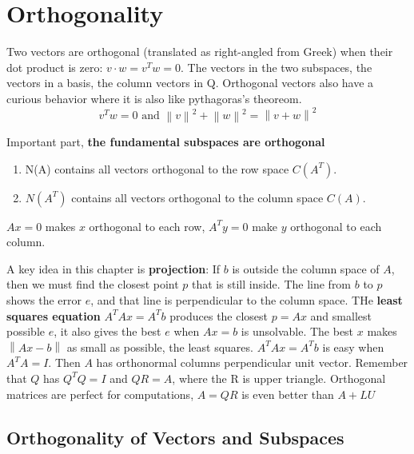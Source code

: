 \chapter{Orthogonality}

Two vectors are orthogonal (translated as right-angled from Greek) when their dot product is zero: \(v \cdot w = v^{T}w = 0\). The vectors in the two subspaces, the vectors in a basis, the column vectors in Q. Orthogonal vectors also have a curious behavior where it is also like pythagoras's theoreom. 
\[
    v^{T}w = 0 \text{ and } \left\lVert v \right\rVert^2 + \left\lVert w \right\rVert^2 = \left\lVert v + w \right\lVert^2
\] 

Important part, \textbf{the fundamental subspaces are orthogonal}
\begin{enumerate}
    \item N(A) contains all vectors orthogonal to the row space \(C(A^T)\).
    \item \(N(A^T)\)  contains all vectors orthogonal to the column space \(C(A)\). 
\end{enumerate} 
\(Ax = 0\) makes \(x\) orthogonal to each row, \(A^{T}y = 0\) make \(y\) orthogonal to each column. 

A key idea in this chapter is \textbf{projection}: If \(b\) is outside the column space of \(A\), then we must find the closest point \(p\) that is still inside. The line from \(b\) to \(p\) shows the error \(e\), and that line is perpendicular to the column space.    THe \textbf{least squares equation} \(A^{T}Ax = A^{T}b\) produces the closest \(p = Ax\) and smallest possible \(e\), it also gives the best \(e\) when \(Ax = b\) is unsolvable. The best \(x\) makes \(\left\lVert Ax - b \right\lVert\) as small as possible, the least squares. \(A^{T}Ax = A^{T}b\) is easy when \(A^{T}A = I\). Then \(A\) has orthonormal columns perpendicular unit vector. Remember that \(Q\) has \(Q^{T}Q = I\) and \(QR = A\), where the R is upper triangle. Orthogonal matrices are perfect for computations, \(A = QR\) is even better than \(A+LU\)               

\section{Orthogonality of Vectors and Subspaces}

